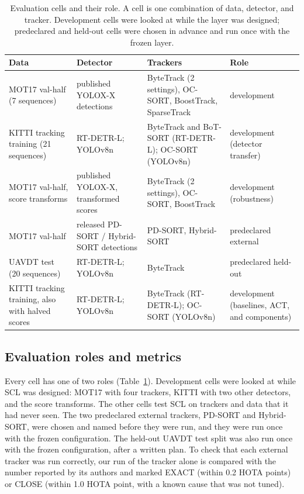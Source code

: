 \documentclass[pdflatex,sn-mathphys-num,iicol]{sn-jnl}
\newcommand{\scl}{SCL}
\begin{document}
\begin{table}[t]
\caption{Evaluation cells and their role. A cell is one combination of data,
detector, and tracker. Development cells were looked at while the layer was
designed; predeclared and held-out cells were chosen in advance and run once
with the frozen layer.}
\label{tab:data}
\centering\footnotesize
\setlength{\tabcolsep}{4pt}
\begin{tabular}{@{}>{\raggedright\arraybackslash}p{29mm}>{\raggedright\arraybackslash}p{25mm}>{\raggedright\arraybackslash}p{42mm}>{\raggedright\arraybackslash}p{25mm}@{}}
\toprule
Data & Detector & Trackers & Role\\
\midrule
MOT17 val-half (7 sequences) & published YOLOX-X detections & ByteTrack (2 settings), OC-SORT, BoostTrack, SparseTrack & development\\
KITTI tracking training (21 sequences) & RT-DETR-L; YOLOv8n & ByteTrack and BoT-SORT (RT-DETR-L); OC-SORT (YOLOv8n) & development (detector transfer)\\
MOT17 val-half, score transforms & published YOLOX-X, transformed scores & ByteTrack (2 settings), OC-SORT, BoostTrack & development (robustness)\\
MOT17 val-half & released PD-SORT / Hybrid-SORT detections & PD-SORT, Hybrid-SORT & predeclared external\\
UAVDT test (20 sequences) & RT-DETR-L; YOLOv8n & ByteTrack & predeclared held-out\\
KITTI tracking training, also with halved scores & RT-DETR-L; YOLOv8n & ByteTrack (RT-DETR-L); OC-SORT (YOLOv8n) & development (baselines, ACT, and components)\\
\bottomrule
\end{tabular}
\end{table}

\subsection{Evaluation roles and metrics}\label{sec:roles}
Every cell has one of two roles (Table~\ref{tab:data}). Development cells
were looked at while \scl{} was designed: MOT17 with four trackers, KITTI
with two other detectors, and the score transforms. The other cells test
\scl{} on trackers and data that it had never seen. The two predeclared
external trackers, PD-SORT and Hybrid-SORT, were chosen and named before they
were run, and they were run once with the frozen configuration. The held-out
UAVDT test split was also run once with the frozen configuration, after a
written plan. To check that each external tracker was run correctly, our run
of the tracker alone is compared with the number reported by its authors and
marked EXACT (within 0.2 HOTA points) or CLOSE (within 1.0 HOTA point, with a
known cause that was not tuned).
\end{document}
